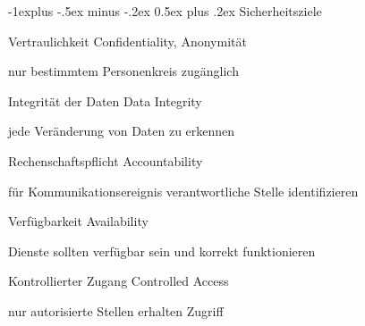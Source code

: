 \documentclass[a4paper]{article}
\makeatletter
\renewcommand{\subsection}{\@startsection{subsection}{2}{0mm}%
 {-1explus -.5ex minus -.2ex}%
 {0.5ex plus .2ex}%
 {\normalfont\normalsize\bfseries}}
\makeatother
\begin{document}
\raggedright
\begin{multicols}{3}\scriptsize
      \setlength{\premulticols}{1pt}
      \setlength{\postmulticols}{1pt}
      \setlength{\multicolsep}{1pt}
      \setlength{\columnsep}{2pt}

      \subsection{Sicherheitsziele}
      \begin{description*}
            \item[Vertraulichkeit] Confidentiality, Anonymität
            \begin{itemize*}
                  \item nur bestimmtem Personenkreis zugänglich
            \end{itemize*}
            \item[Integrität der Daten] Data Integrity
            \begin{itemize*}
                  \item jede Veränderung von Daten zu erkennen
            \end{itemize*}
            \item[Rechenschaftspflicht] Accountability
            \begin{itemize*}
                  \item für Kommunikationsereignis verantwortliche Stelle identifizieren
            \end{itemize*}
            \item[Verfügbarkeit] Availability
            \begin{itemize*}
                  \item Dienste sollten verfügbar sein und korrekt funktionieren
            \end{itemize*}
            \item[Kontrollierter Zugang] Controlled Access
            \begin{itemize*}
                  \item nur autorisierte Stellen erhalten Zugriff
            \end{itemize*}
      \end{description*}


\end{multicols}
\end{document}

